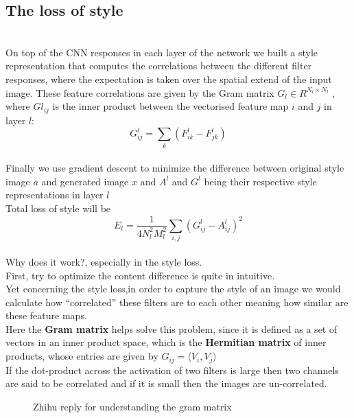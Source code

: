 \documentclass[11pt, a4paper]{article} %
\begin{document}
\subsection{The loss of style}
\\ On top of the CNN responses in each layer of the network we built a style representation
that computes the correlations between the different filter responses, where the expectation is
taken over the spatial extend of the input image. These feature correlations are given by the
Gram matrix $G_{l} \in R^{N_l \times N_l}$
, where $G{l}_{ij}$ is the inner product between the vectorised feature map $i$ and $j$ in layer $l$:
\\ {\Large $$G^{l}_{ij} = \sum_{k}(F^{l}_{ik} - F^l_{jk})$$}
\\ Finally we use gradient descent to minimize the difference between original style image $a$ and generated image $x$ and $A^l$ and $G^l$ being their respective style representations in layer $l$
\\ Total loss of style will be
\\ {\Large $$E_{l} = \frac{1}{4N^{2}_{l}M^2_{l}} \sum_{i, j}(G^{l}_{ij} - A^l_{ij})^2$$}
\\ {\Large Why does it work?, especially in the style loss.}
\\ First, try to optimize the content difference is quite in intuitive.
\\ Yet concerning the style loss,in order to capture the style of an image we would calculate how “correlated” these filters are to each other meaning how similar are these feature maps.
\\ Here the \textbf{Gram matrix} helps solve this problem, since it is defined as a set of vectors in an inner product space, which is the \textbf{Hermitian matrix} of inner products, whose entries are given by $G_{ij} = \langle V_{i}, V_{j}\rangle$
\\ If the dot-product across the activation of two filters is large then two channels are said to be correlated and if it is small then the images are un-correlated.
\\ 
\begin{figure}[H]
    \centering
    \caption{Zhihu reply for understanding the gram matrix}
\end{figure}
\end{document}
